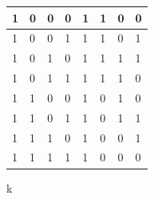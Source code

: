 \documentclass[11pt]{article}
\begin{document}
\begin{table}[H]
\begin{tabular}{|llll||llll|}
		\multicolumn{1}{|l|}{1}                    & \multicolumn{1}{l|}{0}                  & \multicolumn{1}{l|}{0}     & 0     & \multicolumn{1}{l|}{1}     & \multicolumn{1}{l|}{1}     & \multicolumn{1}{l|}{0}     & 0     \\ \hline
		\multicolumn{1}{|l|}{1}                    & \multicolumn{1}{l|}{0}                  & \multicolumn{1}{l|}{0}     & 1     & \multicolumn{1}{l|}{1}     & \multicolumn{1}{l|}{1}     & \multicolumn{1}{l|}{0}     & 1     \\ \hline
		\multicolumn{1}{|l|}{1}                    & \multicolumn{1}{l|}{0}                  & \multicolumn{1}{l|}{1}     & 0     & \multicolumn{1}{l|}{1}     & \multicolumn{1}{l|}{1}     & \multicolumn{1}{l|}{1}     & 1     \\ \hline
		\multicolumn{1}{|l|}{1}                    & \multicolumn{1}{l|}{0}                  & \multicolumn{1}{l|}{1}     & 1     & \multicolumn{1}{l|}{1}     & \multicolumn{1}{l|}{1}     & \multicolumn{1}{l|}{1}     & 0     \\ \hline
		\multicolumn{1}{|l|}{1}                    & \multicolumn{1}{l|}{1}                  & \multicolumn{1}{l|}{0}     & 0     & \multicolumn{1}{l|}{1}     & \multicolumn{1}{l|}{0}     & \multicolumn{1}{l|}{1}     & 0     \\ \hline
		\multicolumn{1}{|l|}{1}                    & \multicolumn{1}{l|}{1}                  & \multicolumn{1}{l|}{0}     & 1     & \multicolumn{1}{l|}{1}     & \multicolumn{1}{l|}{0}     & \multicolumn{1}{l|}{1}     & 1     \\ \hline
		\multicolumn{1}{|l|}{1}                    & \multicolumn{1}{l|}{1}                  & \multicolumn{1}{l|}{1}     & 0     & \multicolumn{1}{l|}{1}     & \multicolumn{1}{l|}{0}     & \multicolumn{1}{l|}{0}     & 1     \\ \hline
		\multicolumn{1}{|l|}{1}                    & \multicolumn{1}{l|}{1}                  & \multicolumn{1}{l|}{1}     & 1     & \multicolumn{1}{l|}{1}     & \multicolumn{1}{l|}{0}     & \multicolumn{1}{l|}{0}     & 0     \\ \hline
	\end{tabular}
\end{table}
k
\end{document}
